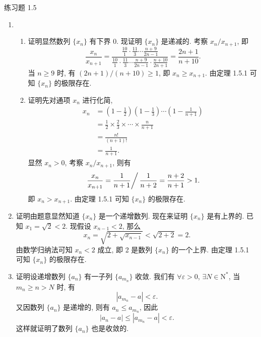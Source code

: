 \documentclass[12pt]{article}
\begin{document}
\pagestyle{empty}

\begin{center}
    {\heiti 练习题 1.5}
\end{center}

\begin{enumerate}
    \item 
        \begin{enumerate}[(1)]
            \item {\heiti 证明}\quad 显然数列 $\{x_n\}$ 有下界 $0$. 现证明 $\{x_n\}$ 是递减的. 考察 $x_n / x_{n+1}$, 即
                \[
                    \frac{x_n}{x_{n+1}} = \frac{\frac{10}{1}\cdot\frac{11}{3}\cdots\frac{n+9}{2n-1}}{\frac{10}{1}\cdot\frac{11}{3}\cdots\frac{n+9}{2n-1}\cdot\frac{n+10}{2n+1}} = \frac{2n+1}{n+10}.    
                \]
                当 $n \geqslant 9$ 时, 有 $(2n+1)/(n+10) \geqslant 1$, 即 $x_n \geqslant x_{n+1}$. 由定理 1.5.1 可知 $\{x_n\}$ 的极限存在.
            \item {\heiti 证明}\quad 先对通项 $x_n$ 进行化简,
                \begin{align*}
                    x_n &= \left(1 - \frac12\right)\left(1 - \frac13\right)\cdots\left(1 - \frac{1}{n+1}\right) \\
                        &= \frac12 \times \frac23 \times \cdots \times \frac{n}{n+1} \\
                        &= \frac{n!}{(n+1)!} \\
                        &= \frac{1}{n+1}.    
                \end{align*}
                显然 $x_n > 0$, 考察 $x_n/x_{n+1}$, 则有
                \[
                    \left. \frac{x_n}{x_{n+1}} = \frac{1}{n+1} \right/ \frac{1}{n+2} = \frac{n+2}{n+1} > 1.    
                \]
                即 $x_n > x_{n+1}$. 由定理 1.5.1 可知 $\{x_n\}$ 的极限存在.
        \end{enumerate}
    \item {\heiti 证明}\quad 由题意显然知道 $\{x_n\}$ 是一个递增数列. 现在来证明 $\{x_n\}$ 是有上界的.
        已知 $x_1 = \sqrt{2} < 2$. 现假设 $x_{n - 1} < 2$, 那么
        \[
            x_n = \sqrt{2 + \sqrt{x_{n-1}}} < \sqrt{2 + 2} = 2.    
        \]
        由数学归纳法可知 $x_n < 2$ 成立, 即 2 是数列 $\{x_n\}$ 的一个上界. 由定理 1.5.1 可知 $\{x_n\}$ 的极限存在.
    \item {\heiti 证明}\quad 设递增数列 $\{a_n\}$ 有一子列 $\{a_{m_n}\}$ 收敛.
        我们有 $\forall \varepsilon > 0$, $\exists N \in \mathrm{N}^*$, 当 $m_n \geqslant n > N$ 时, 有
        \[
            |a_{m_n} - a| < \varepsilon.    
        \]
        又因数列 $\{a_n\}$ 是递增的, 则有 $a_n \leqslant a_{m_n}$, 因此
        \[
            |a_n - a| \leqslant |a_{m_n} - a| < \varepsilon.    
        \]
        这样就证明了数列 $\{a_n\}$ 也是收敛的.


\end{enumerate}
\end{document}

